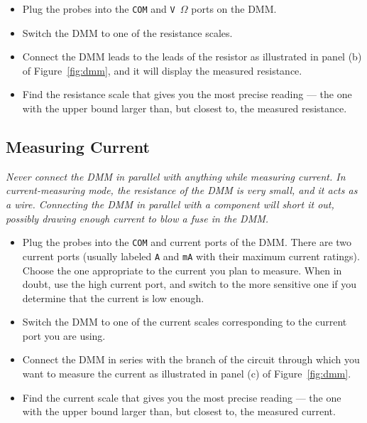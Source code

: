 \documentclass[11pt]{article}
\begin{document}
\begin{itemize}
\item Plug the probes into the \texttt{COM} and \texttt{V\,$\Omega$}
  ports on the DMM.

\item Switch the DMM to one of the resistance scales.
  
\item Connect the DMM leads to the leads of the resistor as illustrated in
  panel (b) of Figure~\ref{fig:dmm}, and it will display the measured
  resistance.

\item Find the resistance scale that gives you the most
  precise reading --- the one with the upper bound larger than, but
  closest to, the measured resistance.
\end{itemize}

\subsection{Measuring Current}

\emph{Never connect the DMM in parallel with anything while measuring
  current. In current-measuring mode, the resistance of the DMM is
  very small, and it acts as a wire. Connecting the DMM in parallel
  with a component will short it out, possibly drawing enough current
  to blow a fuse in the DMM.}

\begin{itemize}
\item Plug the probes into the \texttt{COM} and current ports of the
  DMM. There are two current ports (usually labeled \texttt{A} and
  \texttt{mA} with their maximum current ratings). Choose the one
  appropriate to the current you plan to measure. When in doubt, use
  the high current port, and switch to the more sensitive one if you
  determine that the current is low enough.

\item Switch the DMM to one of the current scales corresponding to the
  current port you are using.

\item Connect the DMM in series with the branch of the circuit through
  which you want to measure the current as illustrated in panel (c) of
  Figure~\ref{fig:dmm}.
  
\item Find the current scale that gives you the most precise reading
  --- the one with the upper bound larger than, but closest to, the
  measured current.
\end{itemize}
\end{document}
